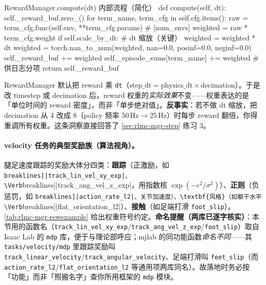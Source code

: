 \begin{codebox}[Python]{RewardManager.compute(dt) 内部流程（简化）}
def compute(self, dt):
    self._reward_buf.zero_()
    for term_name, term_cfg in self.cfg.items():
        raw = term_cfg.func(self.env, **term_cfg.params)   # [num_envs]
        weighted = raw * term_cfg.weight
        if self.scale_by_dt:                               # dt 缩放（关键）
            weighted = weighted * dt
        weighted = torch.nan_to_num(weighted, nan=0.0, posinf=0.0, neginf=0.0)
        self._reward_buf += weighted
        self._episode_sums[term_name] += weighted          # 供日志分项
    return self._reward_buf
\end{codebox}

\begin{insight}\label{ins:rlmc-mgr-dtscale}
RewardManager 默认把 reward 乘 \verb|dt|（$\text{step\_dt}=\text{physics\_dt}\times\text{decimation}$）。于是改 timestep 或 decimation 后，reward 权重的\emph{实际效果}不变——权重表达的是「单位时间的 reward 密度」，而非「单步绝对值」。\textbf{反事实}：若不做 dt 缩放，把 decimation 从 4 改成 8（policy 频率 50\,Hz$\to$25\,Hz）时每步 reward 翻倍，你得重调所有权重。这条洞察直接回答了 \cref{sec:rlmc-mgr-step} 练习 3。
\end{insight}

\paragraph{velocity 任务的典型奖励族（算法视角）。}腿足速度跟踪的奖励大体分四类：\textbf{跟踪}（正激励，如 \Verb[breaklines]|track_lin_vel_xy_exp|、\Verb[breaklines]|track_ang_vel_z_exp|，用指数核 $\exp(-e^2/\sigma^2)$）、\textbf{正则}（负惩罚，如 \Verb[breaklines]|action_rate_l2|、关节加速度）、\textbf{风格}（如躯干水平 \Verb[breaklines]|flat_orientation_l2|）、\textbf{接触}（如足端打滑 \verb|foot_slip|）。\cref{tab:rlmc-mgr-rewexample} 给出权重符号约定。\textbf{命名提醒（两库已逐字核实）}：本节用的函数名（\texttt{track\_lin\_vel\_xy\_exp}/\allowbreak\texttt{track\_ang\_vel\_z\_exp}/\allowbreak\texttt{foot\_slip}）取自 Isaac Lab 的 \texttt{mdp} 库，便于与理论部呼应；mjlab 的同功能函数\emph{命名不同}——其 \texttt{tasks/\allowbreak velocity/\allowbreak mdp} 里跟踪奖励叫 \texttt{track\_linear\_velocity}/\allowbreak\texttt{track\_angular\_velocity}、足端打滑叫 \texttt{feet\_slip}（而 \texttt{action\_rate\_l2}/\allowbreak\texttt{flat\_orientation\_l2} 等通用项两库同名）。故落地时务必按「功能」而非「照搬名字」查你所用框架的 \texttt{mdp} 模块。

